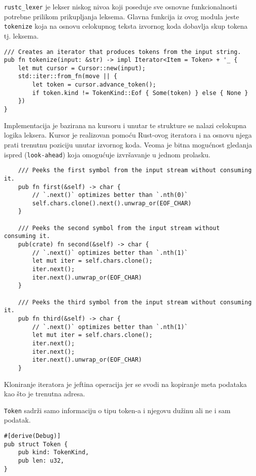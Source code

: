 \documentclass{article}
\begin{document}
\verb|rustc_lexer| je lekser niskog nivoa koji poseduje sve osnovne
funkcionalnosti potrebne prilikom prikupljanja leksema.
Glavna funkcija iz ovog modula jeste \verb|tokenize| koja na osnovu celokupnog teksta 
izvornog koda dobavlja skup tokena tj. leksema.

\begin{verbatim}
/// Creates an iterator that produces tokens from the input string.
pub fn tokenize(input: &str) -> impl Iterator<Item = Token> + '_ {
    let mut cursor = Cursor::new(input);
    std::iter::from_fn(move || {
        let token = cursor.advance_token();
        if token.kind != TokenKind::Eof { Some(token) } else { None }
    })
}
\end{verbatim}

Implementacija je bazirana na kursoru i unutar te strukture se nalazi celokupna logika leksera. 
Kursor je realizovan pomoću Rust-ovog iteratora i na osnovu njega prati trenutnu poziciju 
unutar izvornog koda. Veoma je bitna mogućnost gledanja ispred (\verb|look-ahead|) koja omogućuje 
izvršavanje u jednom prolasku.

\begin{verbatim}
    /// Peeks the first symbol from the input stream without consuming it.
    pub fn first(&self) -> char {
        // `.next()` optimizes better than `.nth(0)`
        self.chars.clone().next().unwrap_or(EOF_CHAR)
    }

    /// Peeks the second symbol from the input stream without consuming it.
    pub(crate) fn second(&self) -> char {
        // `.next()` optimizes better than `.nth(1)`
        let mut iter = self.chars.clone();
        iter.next();
        iter.next().unwrap_or(EOF_CHAR)
    }

    /// Peeks the third symbol from the input stream without consuming it.
    pub fn third(&self) -> char {
        // `.next()` optimizes better than `.nth(1)`
        let mut iter = self.chars.clone();
        iter.next();
        iter.next();
        iter.next().unwrap_or(EOF_CHAR)
    }
\end{verbatim}
Kloniranje iteratora je jeftina operacija jer se svodi na kopiranje meta podataka
kao što je trenutna adresa.

\verb|Token| sadrži samo informaciju o tipu token-a i njegovu dužinu ali ne i 
sam podatak.

\begin{verbatim}
#[derive(Debug)]
pub struct Token {
    pub kind: TokenKind,
    pub len: u32,
}   
\end{verbatim}
\end{document}
